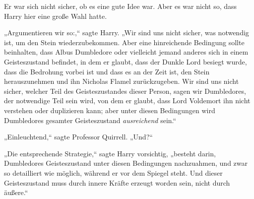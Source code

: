 Er war sich nicht sicher, ob es eine gute Idee war. Aber es war nicht so, dass Harry hier eine große Wahl hatte.

„Argumentieren wir so:,“ sagte Harry. „Wir sind uns nicht sicher, was notwendig ist, um den Stein wiederzubekommen. Aber eine hinreichende Bedingung sollte beinhalten, dass Albus Dumbledore oder vielleicht jemand anderes sich in einem Geisteszustand befindet, in dem er glaubt, dass der Dunkle Lord besiegt wurde, dass die Bedrohung vorbei ist und dass es an der Zeit ist, den Stein herauszunehmen und ihn Nicholas Flamel zurückzugeben. Wir sind uns nicht sicher, welcher Teil des Geisteszustandes dieser Person, sagen wir Dumbledores, der notwendige Teil sein wird, von dem er glaubt, dass Lord Voldemort ihn nicht verstehen oder duplizieren kann; aber unter diesen Bedingungen wird Dumbledores gesamter Geisteszustand \emph{ausreichend} sein.“

„Einleuchtend,“ sagte Professor Quirrell. „Und?“

„Die entsprechende Strategie,“ sagte Harry vorsichtig, „besteht darin, Dumbledores Geisteszustand unter diesen Bedingungen nachzuahmen, und zwar so detailliert wie möglich, während er vor dem Spiegel steht. Und dieser Geisteszustand muss durch innere Kräfte erzeugt worden sein, nicht durch äußere.“

